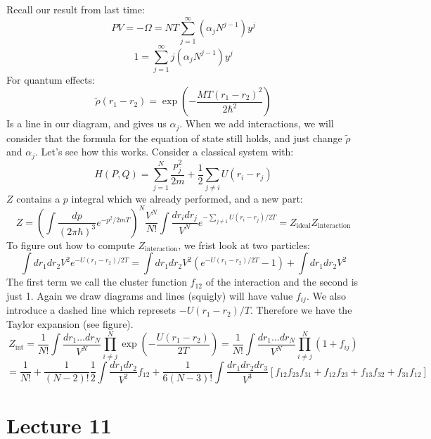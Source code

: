 \documentclass[12 pt]{article}
\begin{document}
Recall our result from last time:
\[      PV = - \Omega = NT \sum_{j=1}^{\infty} (\alpha_j N^{j-1}) y^j      \]
\[    1 =     \sum_{j=1}^{\infty} j (\alpha_j N^{j-1}) y^j     \]
For quantum effects:
\[   \tilde \rho(r_1 - r_2) = \exp \left( - \frac{MT(r_1 - r_2)^2}{2\hbar^2} \right)    \]
Is a line in our diagram, and gives us $\alpha_j$. When we add interactions, we will consider that the formula for the equation of state still holds, and just change $\tilde \rho$ and $\alpha_j$. Let's see how this works. Consider a classical system with:
\[    H(P,Q) = \sum_{j=1}^N \frac{p_j^2}{2m} + \frac{1}{2} \sum_{j\neq i} U(r_i - r_j)  \]
$Z$ contains a $p$ integral which we already performed, and a new part:
\[  Z = \left(  \int \frac{dp}{(2\pi\hbar)^3} e^{-p^2/2mT}  \right)^N \frac{V^N}{N!} \int \frac{dr_i dr_j}{V^N} e^{- \sum_{j\neq 1} U(r_i - r_j) /2T} = Z_{\text{ideal}} Z_{\text{interaction}}  \]
To figure out how to compute $Z_{\text{interaction}}$, we frist look at two particles:
\[     \int{dr_1dr_2}{V^2}  e^{-U(r_1 - r_2)/2T}  =   \int{dr_1dr_2}{V^2}  \left( e^{-U(r_1 - r_2)/2T} - 1 \right) +  \int{dr_1dr_2}{V^2}  \]
The first term we call the cluster function $f_{12}$ of the interaction and the second is just 1. Again we draw diagrams and lines (squigly) will have value $f_{ij}$. We also introduce a dashed line which represets $ - U(r_1 - r_2)/T$. Therefore we have the Taylor expansion (see figure).
\[     Z_{\text{int}} =\frac{1}{N!} \int \frac{dr_1 \dots dr_N}{V^N} \prod_{i\neq j}^N \exp \left(  - \frac{U(r_1 - r_2)}{2T} \right)  =  \frac{1}{N!}  \int \frac{dr_1 \dots dr_N}{V^N} \prod_{i\neq j}^N   (1+f_{ij}) \]
\[   = \frac{1}{N!} + \frac{1}{(N-2)!}\frac{1}{2} \int \frac{dr_1 dr_2}{V^2} f_{12}  + \frac{1}{6(N-3)!} \int \frac{dr_1 dr_2 dr_3}{V^3} \left[ f_{12}f_{23}f_{31} + f_{12}f_{23} + f_{13}f_{32} + f_{31}f_{12}  \right]  \]


\section*{Lecture 11}
\end{document}
